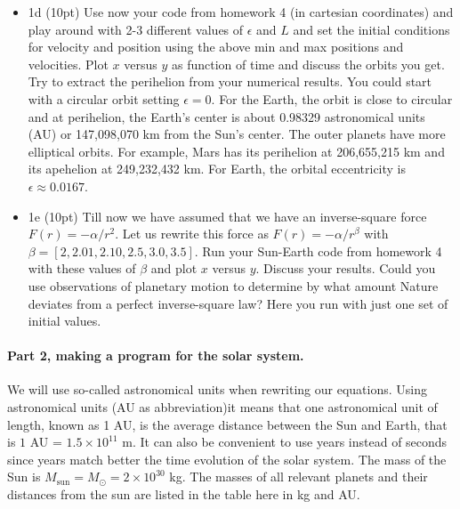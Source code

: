 \documentclass[%
oneside,                 %
final,                   %
10pt]{article}
\begin{document}
\begin{itemize}
\item 1d (10pt) Use now your code from homework 4 (in cartesian coordinates) and play around with 2-3 different values of $\epsilon$ and $L$ and set the initial conditions for velocity and position using the above min and max positions and velocities. Plot $x$ versus $y$ as function of time and discuss the orbits you get. Try to extract the perihelion from your numerical results. You could start with a circular orbit setting $\epsilon=0$. For the Earth, the orbit is close to circular and at perihelion, the Earth's center is about 0.98329 astronomical units (AU) or 147,098,070 km from the Sun's center. The outer planets have more elliptical orbits. For example, Mars has its perihelion at 206,655,215 km and its apehelion at 249,232,432 km. For Earth, the orbital eccentricity is $\epsilon\approx 0.0167$. 

\item 1e (10pt) Till now we have assumed that we have an inverse-square force $F(r) = -\alpha/r^2$. Let us rewrite this force as $F(r) = -\alpha/r^{\beta}$ with $\beta=[2,2.01,2.10,2.5,3.0,3.5]$. Run your Sun-Earth code from homework 4 with these values of $\beta$ and plot $x$ versus $y$. Discuss your results. Could you use observations of planetary motion to determine by what amount Nature deviates from a perfect inverse-square law? Here you run with just one set of initial values. 
\end{itemize}

\noindent
\paragraph{Part 2, making a program for the solar system.}
We will use so-called astronomical units when rewriting our equations. 
Using astronomical units (AU as abbreviation)it means that 
one astronomical unit of length, known as 1 AU, is the average distance between the Sun and Earth, that is
$1$ AU = $1.5\times 10^{11}$ m.  It can also be convenient to use years instead of seconds since years match
better the time evolution of the solar system. The mass of the Sun is $M_{\mathrm{sun}}=M_{\odot}=2\times 10^{30}$ kg. The masses of all relevant planets and their distances from the sun are listed in the table here in kg and AU.
\end{document}

